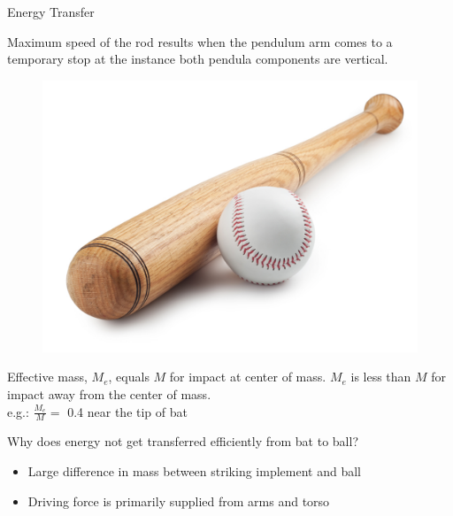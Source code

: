 \documentclass[tikz]{beamer}
\begin{document}
\begin{frame} {Energy Transfer}
	\only<1> {
		Maximum speed of the rod results when the pendulum arm comes to a temporary stop at the instance both pendula components are vertical.\\
		\begin{figure}
			\centering
			\includegraphics[scale=0.4]{baseballbat.jpg}
		\end{figure}
		Effective mass, $M_e$, equals $M$ for impact at center of mass. $M_e$ is less than $M$ for impact away from the center of mass.\\
		\vspace{0.1in}
		e.g.:	$\frac{M_e}{M} =$ 0.4 near the tip of bat\\

	}
	 {
		Why does energy not get transferred efficiently from bat to ball?\\
		\begin{itemize}
			\item Large difference in mass between striking implement and ball
			\item Driving force is primarily supplied from arms and torso
		\end{itemize}

}
\end{frame}
\end{document}
